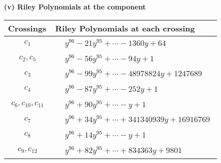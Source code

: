 \documentclass[1p]{elsarticle_modified}
\theoremstyle{definition}
\begin{document}
\newpage\renewcommand{\arraystretch}{1}
\flushleft \textbf{(v) Riley Polynomials at the component}\newline \\
\begin{tabular}{m{50pt}|m{274pt}}
Crossings & \hspace{64pt}Riley Polynomials at each crossing \\
\hline $$\begin{aligned}c_{1}\end{aligned}$$&$\begin{aligned}
&y^{96}-21 y^{95}+\cdots-1360 y+64
\end{aligned}$\\
\hline $$\begin{aligned}c_{2},c_{5}\end{aligned}$$&$\begin{aligned}
&y^{96}-56 y^{95}+\cdots-94 y+1
\end{aligned}$\\
\hline $$\begin{aligned}c_{3}\end{aligned}$$&$\begin{aligned}
&y^{96}-99 y^{95}+\cdots-48978824 y+1247689
\end{aligned}$\\
\hline $$\begin{aligned}c_{4}\end{aligned}$$&$\begin{aligned}
&y^{96}-87 y^{95}+\cdots-252 y+1
\end{aligned}$\\
\hline $$\begin{aligned}c_{6},c_{10},c_{11}\end{aligned}$$&$\begin{aligned}
&y^{96}+90 y^{95}+\cdots- y+1
\end{aligned}$\\
\hline $$\begin{aligned}c_{7}\end{aligned}$$&$\begin{aligned}
&y^{96}+34 y^{95}+\cdots+341340939 y+16916769
\end{aligned}$\\
\hline $$\begin{aligned}c_{8}\end{aligned}$$&$\begin{aligned}
&y^{96}+14 y^{95}+\cdots- y+1
\end{aligned}$\\
\hline $$\begin{aligned}c_{9},c_{12}\end{aligned}$$&$\begin{aligned}
&y^{96}+82 y^{95}+\cdots+834363 y+9801
\end{aligned}$\\
\hline
\end{tabular}\\~\\
\end{document}
